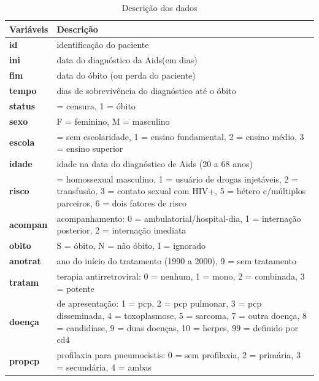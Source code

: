 \documentclass[a4paper, oneside]{book}\usepackage[]{graphicx}\usepackage[]{color}
\newenvironment{knitrout}{}{} %
\begin{document}
\begin{knitrout}
\color{fgcolor}\begin{table}[!h]

\caption{\label{tab:script0}Descrição dos dados}
\centering
\fontsize{10}{12}\selectfont
\begin{tabular}[t]{>{\bfseries\leavevmode\color{red}}l|>{\raggedright\arraybackslash}p{30em}}
\hline
Variáveis & Descrição\\
\hline
id & identificação do paciente\\
\hline
ini & data do diagnóstico da Aids(em dias)\\
\hline
fim & data do óbito (ou perda do paciente)\\
\hline
tempo & dias de sobrevivência do diagnóstico até o óbito\\
\hline
status & 0 = censura, 1 = óbito\\
\hline
sexo & F = feminino, M = masculino\\
\hline
escola & 0 = sem escolaridade, 1 = ensino fundamental, 2 = ensino médio, 3 = ensino superior\\
\hline
idade & idade na data do diagnóstico de Aids (20 a 68 anos)\\
\hline
risco & 0 = homossexual masculino, 1 = usuário de drogas injetáveis, 2 = transfusão, 3 = contato sexual com HIV+, 5 = hétero c/múltiplos parceiros, 6 = dois fatores de risco\\
\hline
acompan & acompanhamento: 0 = ambulatorial/hospital-dia, 1 = internação posterior, 2 = internação imediata\\
\hline
obito & S = óbito, N = não óbito, I = ignorado\\
\hline
anotrat & ano do início do tratamento (1990 a 2000), 9 = sem tratamento\\
\hline
tratam & terapia antirretroviral: 0 = nenhum, 1 = mono, 2 = combinada, 3 = potente\\
\hline
doença & de apresentação: 1 = pcp, 2 = pcp pulmonar, 3 = pcp disseminada, 4 = toxoplasmose, 5 = sarcoma, 7 = outra doença, 8 = candidíase, 9 = duas doenças, 10 = herpes, 99 = definido por cd4\\
\hline
propcp & profilaxia para pneumocistis: 0 = sem profilaxia, 2 = primária, 3 = secundária, 4 = ambas\\
\hline
\end{tabular}
\end{table}


\end{knitrout}
\end{document}
